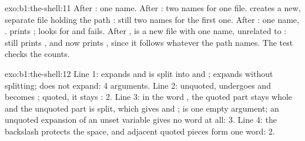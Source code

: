 \begin{solution}{exo:b1:the-shell:11}
After : one name. After : two names for one file.  creates a new, separate file
holding the path : still two names for the first one. After : one name, .  prints
;  looks for  and fails. After ,  is a new file with one name,
unrelated to :  still prints , and  now prints , since it follows
whatever the path names. The test  checks the counts.
\end{solution}

\begin{solution}{exo:b1:the-shell:12}
Line 1:  expands and is split into  and ;  expands without splitting;  does
not expand: 4 arguments. Line 2: unquoted, \code{*} undergoes  and becomes ; quoted, it
stays \code{*}: 2. Line 3: in the word , the quoted part stays whole and the unquoted part is split, which
gives  and ;  is one empty argument; an unquoted expansion of an unset variable gives no word
at all: 3. Line 4: the backslash protects the space, and adjacent quoted pieces form one word: 2.
\end{solution}

